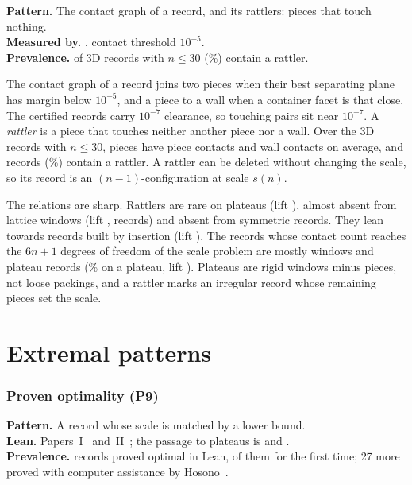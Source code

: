 \documentclass[11pt,a4paper]{article}
\begin{document}
\begin{summarybox}
\textbf{Pattern.} The contact graph of a record, and its rattlers: pieces that touch nothing.\\
\textbf{Measured by.} , contact threshold $10^{-5}$.\\
\textbf{Prevalence.} \nConRattler{} of \nCon{} 3D records with $n\le30$ (\pctConRattler\%) contain a rattler.
\end{summarybox}

The contact graph of a record joins two pieces when their best separating plane has margin below $10^{-5}$, and a piece to a wall when a container facet is that close. The certified records carry $10^{-7}$ clearance, so touching pairs sit near $10^{-7}$. A \emph{rattler} is a piece that touches neither another piece nor a wall. Over the \nCon{} 3D records with $n\le30$, pieces have \meanCoord{} piece contacts and \meanWall{} wall contacts on average, and \nConRattler{} records (\pctConRattler\%) contain a rattler. A rattler can be deleted without changing the scale, so its record is an $(n-1)$-configuration at scale $s(n)$.

The relations are sharp. Rattlers are rare on plateaus (lift \liftRatPla{}), almost absent from lattice windows (lift \liftRatWin{}, \nRatWin{} records) and absent from symmetric records. They lean towards records built by insertion (lift \liftRatIns{}). The \nConIso{} records whose contact count reaches the $6n+1$ degrees of freedom of the scale problem are mostly windows and plateau records (\pIsoPla\% on a plateau, lift \liftIsoPla{}). Plateaus are rigid windows minus pieces, not loose packings, and a rattler marks an irregular record whose remaining pieces set the scale.

\clearpage
\part{Extremal patterns}\label{part:ext}

\section{Proven optimality (P9)}\label{sec:extremal}

\begin{summarybox}
\textbf{Pattern.} A record whose scale is matched by a lower bound.\\
\textbf{Lean.} Papers~I~\cite{cubecentre} and~II~\cite{widthball}; the passage to plateaus is  and .\\
\textbf{Prevalence.} \nProven{} records proved optimal in Lean, \nNovel{} of them for the first time; 27 more proved with computer assistance by Hosono~\cite{hosono}.
\end{summarybox}
\end{document}
